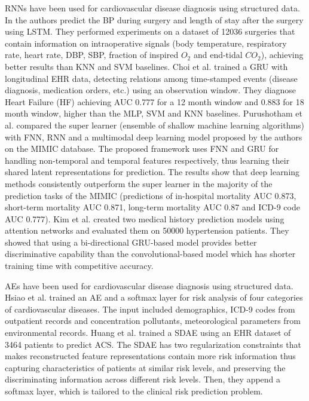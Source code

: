 \documentclass[journal]{IEEEtran}
\begin{document}
RNNs have been used for cardiovascular disease diagnosis using structured data.
In\cite{gopalswamy2017deep} the authors predict the BP during surgery and length of stay after the surgery using LSTM\@.
They performed experiments on a dataset of 12036 surgeries that contain information on intraoperative signals (body temperature, respiratory rate, heart rate, DBP, SBP, fraction of inspired $O_2$ and end-tidal $CO_2$), achieving better results than KNN and SVM baselines.
Choi et al.\cite{choi2016using} trained a GRU with longitudinal EHR data, detecting relations among time-stamped events (disease diagnosis, medication orders, etc.) using an observation window.
They diagnose Heart Failure (HF) achieving AUC 0.777 for a 12 month window and 0.883 for 18 month window, higher than the MLP, SVM and KNN baselines.
Purushotham et al.\cite{purushotham2018benchmarking} compared the super learner (ensemble of shallow machine learning algorithms)\cite{polley2010super} with FNN, RNN and a multimodal deep learning model proposed by the authors on the MIMIC database.
The proposed framework uses FNN and GRU for handling non-temporal and temporal features respectively, thus learning their shared latent representations for prediction.
The results show that deep learning methods consistently outperform the super learner in the majority of the prediction tasks of the MIMIC (predictions of in-hospital mortality AUC 0.873, short-term mortality AUC 0.871, long-term mortality AUC 0.87 and ICD-9 code AUC 0.777).
Kim et al.\cite{kim2017highrisk} created two medical history prediction models using attention networks and evaluated them on 50000 hypertension patients.
They showed that using a bi-directional GRU-based model provides better discriminative capability than the convolutional-based model which has shorter training time with competitive accuracy.

AEs have been used for cardiovascular disease diagnosis using structured data.
Hsiao et al.\cite{hsiao2016deep} trained an AE and a softmax layer for risk analysis of four categories of cardiovascular diseases.
The input included demographics, ICD-9 codes from outpatient records and concentration pollutants, meteorological parameters from environmental records.
Huang et al.\cite{huang2018regularized} trained a SDAE using an EHR dataset of 3464 patients to predict ACS\@.
The SDAE has two regularization constraints that makes reconstructed feature representations contain more risk information thus capturing characteristics of patients at similar risk levels, and preserving the discriminating information across different risk levels.
Then, they append a softmax layer, which is tailored to the clinical risk prediction problem.
\end{document}
